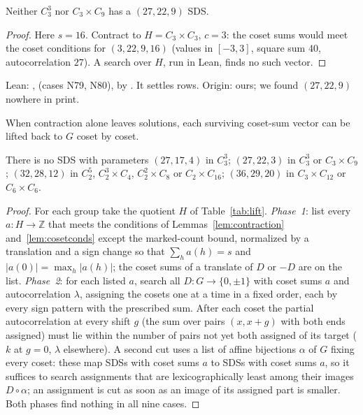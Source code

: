 \begin{theorem}\label{thm:z26}
Neither $C_3^3$ nor $C_3 \times C_9$ has a $(27, 22, 9)$ SDS.
\end{theorem}

\begin{proof}
Here $s = 16$. Contract to $H = C_3 \times C_3$, $c = 3$: the coset sums would meet the coset
conditions for $(3, 22, 9, 16)$ (values in $[-3,3]$, square sum $40$, autocorrelation $27$).
A search over $H$, run in Lean, finds no such vector.
\end{proof}

\begin{remark}
Lean: ,  (cases N79, N80), by
. It settles  rows. Origin: ours; we found
$(27, 22, 9)$ nowhere in print.
\end{remark}

When contraction alone leaves solutions, each surviving coset-sum vector can be lifted back to
$G$ coset by coset.

\begin{theorem}\label{thm:z33}
There is no SDS with parameters $(27, 17, 4)$ in $C_3^3$; $(27, 22, 3)$ in $C_3^3$ or
$C_3 \times C_9$; $(32, 28, 12)$ in $C_2^5$, $C_2^3 \times C_4$, $C_2^2 \times C_8$ or
$C_2 \times C_{16}$; $(36, 29, 20)$ in $C_3 \times C_{12}$ or $C_6 \times C_6$.
\end{theorem}

\begin{proof}
For each group take the quotient $H$ of Table~\ref{tab:lift}. \emph{Phase~1}: list every
$a \colon H \to \mathbb{Z}$ that meets the conditions of Lemmas~\ref{lem:contraction}
and~\ref{lem:cosetconds} except the marked-count bound, normalized by a translation and a
sign change so that $\sum_h a(h) = s$ and $|a(0)| = \max_h |a(h)|$; the coset sums of a
translate of $D$ or $-D$ are on the list. \emph{Phase~2}: for each listed $a$, search all
$D \colon G \to \{0, \pm1\}$ with coset sums $a$ and autocorrelation $\lambda$, assigning the
cosets one at a time in a fixed order, each by every sign pattern with the prescribed sum.
After each coset the partial autocorrelation at every shift $g$ (the sum over pairs
$(x, x+g)$ with both ends assigned) must lie within the number of pairs not yet both assigned
of its target ($k$ at $g = 0$, $\lambda$ elsewhere). A second cut uses a list of affine bijections
$\alpha$ of $G$ fixing every coset: these map SDSs with coset sums $a$ to SDSs with coset sums
$a$, so it suffices to search assignments that are lexicographically least among their images
$D \circ \alpha$; an assignment is cut as soon as an image of its assigned part is smaller. Both
phases find nothing in all nine cases.
\end{proof}

